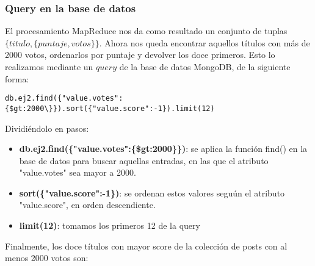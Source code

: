 \subsubsection{Query en la base de datos}

El procesamiento MapReduce nos da como resultado un conjunto de tuplas $\{titulo, \{ puntaje, votos \}\}$. Ahora nos queda encontrar aquellos t\'itulos con m\'as de 2000 votos, ordenarlos por puntaje y devolver los doce primeros. Esto lo realizamos mediante un $query$ de la base de datos MongoDB, de la siguiente forma:

\vspace{2mm}

\begin{lstlisting}
db.ej2.find({"value.votes":{$gt:2000\}}).sort({"value.score":-1}).limit(12)
\end{lstlisting}

Dividi\'endolo en pasos:

\begin{itemize}

\item \textbf{db.ej2.find(\{"value.votes":\{\$gt:2000\}\})}: se aplica la funci\'on find() en la base de datos para buscar aquellas entradas, en las que el atributo "value.votes" sea mayor a 2000.

\item \textbf{sort(\{"value.score":-1\})}: se ordenan estos valores segu\'un el atributo "value.score", en orden descendiente.

\item \textbf{limit(12)}: tomamos los primeros 12 de la query

\end{itemize}

\vspace{2mm}

Finalmente, los doce t\'itulos con mayor score de la colecci\'on de posts con al menos 2000 votos son:

